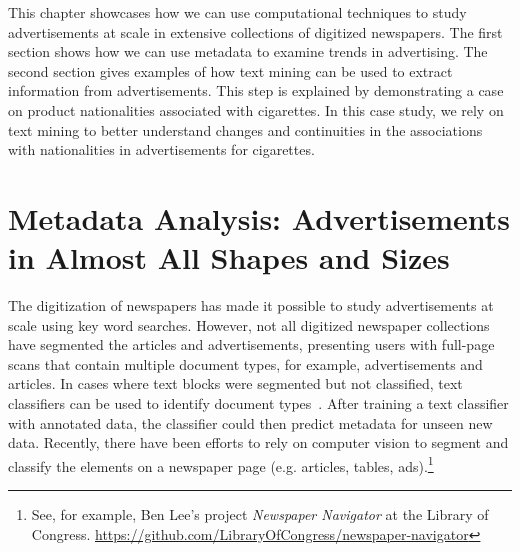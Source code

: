 \documentclass[USenglish]{article}
\begin{document}
This chapter showcases how we can use computational techniques to study advertisements at scale in extensive collections of digitized newspapers. The first section shows how we can use metadata to examine trends in advertising. The second section gives examples of how text mining can be used to extract information from advertisements. This step is explained by demonstrating a case on product nationalities associated with cigarettes. In this case study, we rely on text mining to better understand changes and continuities in the associations with nationalities in advertisements for cigarettes.

\section{Metadata Analysis: Advertisements in Almost All Shapes and Sizes}

The digitization of newspapers has made it possible to study advertisements at scale using key word searches. However, not all digitized newspaper collections have segmented the articles and advertisements, presenting users with full-page scans that contain multiple document types, for example, advertisements and articles. In cases where text blocks were segmented but not classified, text classifiers can be used to identify document types~\cite{bilgin_utilizing_2018}. After training a text classifier with annotated data, the classifier could then predict metadata for unseen new data. Recently, there have been efforts to rely on computer vision to segment and classify the elements on a newspaper page (e.g. articles, tables, ads).\footnote{See, for example, Ben Lee's project \textit{Newspaper Navigator} at the Library of Congress. \url{https://github.com/LibraryOfCongress/newspaper-navigator}} 
\end{document}

